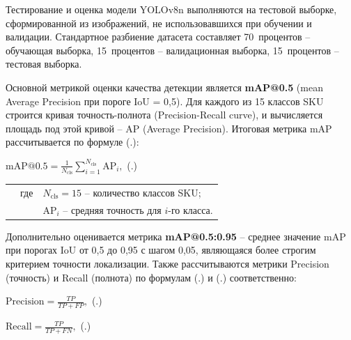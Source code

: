 \subtitlespace
  
{\gostFont

  \par \redline Тестирование и оценка модели YOLOv8n выполняются на тестовой выборке, сформированной из изображений, не использовавшихся при обучении и валидации. Стандартное разбиение датасета составляет 70~процентов {--} обучающая выборка, 15~процентов {--} валидационная выборка, 15~процентов {--} тестовая выборка.

  \par \redline Основной метрикой оценки качества детекции является \textbf{mAP@0.5} (mean Average Precision при пороге IoU = 0,5). Для каждого из 15 классов SKU строится кривая точность-полнота (Precision-Recall curve), и вычисляется площадь под этой кривой {--} AP (Average Precision). Итоговая метрика mAP рассчитывается по формуле (\thechaptercntr .\theformulacntr):

  \formulaspace 
  \par \redline $\mathrm{mAP@0.5} = \frac{1}{N_{\mathrm{cls}}} \sum_{i=1}^{N_{\mathrm{cls}}} \mathrm{AP}_i,$
  \hfill (\thechaptercntr .\theformulacntr) \hspace*{-0.5cm}\redline
  \formulaspace \addtocounter{formulacntr}{1}

  \begin{tabular}{p{0.875cm}p{0.3cm}p{15.175cm}}
      & где  & $N_{\mathrm{cls}} = 15$ {--} количество классов SKU; \\
      &      & $\mathrm{AP}_i$ {--} средняя точность для $i$-го класса. \\
  \end{tabular}
  \vspace{13pt}

  \par \redline Дополнительно оценивается метрика \textbf{mAP@0.5:0.95} {--} среднее значение mAP при порогах IoU от 0,5 до 0,95 с шагом 0,05, являющаяся более строгим критерием точности локализации. Также рассчитываются метрики Precision (точность) и Recall (полнота) по формулам (\thechaptercntr .\theformulacntr) и (\thechaptercntr .\theformulacntr) соответственно:

  \formulaspace 
  \par \redline $\mathrm{Precision} = \frac{TP}{TP + FP},$
  \hfill (\thechaptercntr .\theformulacntr) \hspace*{-0.5cm}\redline
  \formulaspace \addtocounter{formulacntr}{1}

  \formulaspace 
  \par \redline $\mathrm{Recall} = \frac{TP}{TP + FN},$
  \hfill (\thechaptercntr .\theformulacntr) \hspace*{-0.5cm}\redline
  \formulaspace \addtocounter{formulacntr}{1}

}

